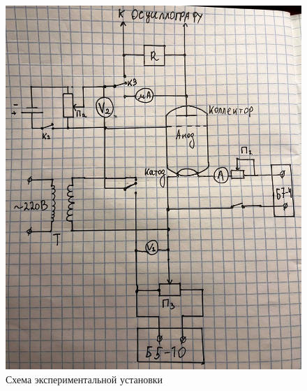 \documentclass[a4paper, 12pt]{article}%
\begin{document}
\begin{figure}[!h]
    \centering
    \includegraphics[scale=0.25]{hand2.jpg}
    \caption{Схема экспериментальной установки}
    \label{fig:vac}
\end{figure}

\newpage
\end{document}
